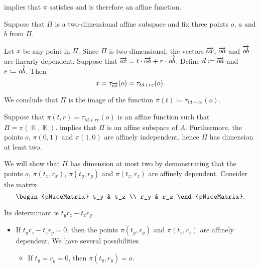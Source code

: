 \begin{defproof}
    implies that \( \pi \) satisfies  and is therefore an affine function.

   Suppose that \( \Pi \) is a two-dimensional affine subspace and fix three points \( o \), \( a \) and \( b \) from \( \Pi \).

  Let \( x \) be any point in \( \Pi \). Since \( \Pi \) is two-dimensional, the vectors \( \overrightarrow{ox} \), \( \overrightarrow{oa} \) and \( \overrightarrow{ob} \) are linearly dependent. Suppose that \( \overrightarrow{ox} = t \cdot \overrightarrow{oa} + r \cdot \overrightarrow{ob} \). Define \( d \coloneqq \overrightarrow{oa} \) and \( e \coloneqq \overrightarrow{ob} \). Then
  \begin{equation*}
    x = \tau_{\overrightarrow{ox}}(o) = \tau_{td + re}(o).
  \end{equation*}

  We conclude that \( \Pi \) is the image of the function \( \pi(t) \coloneqq \tau_{td + re}(o) \).

   Suppose that \( \pi(t, r) = \tau_{td + re}(o) \) is an affine function such that \( \Pi = \pi(\BbbK, \BbbK) \).  implies that \( \Pi \) is an affine subspace of \( A \). Furthermore, the points \( o \), \( \pi(0, 1) \) and \( \pi(1, 0) \) are affinely independent, hence \( \Pi \) has dimension at least two.

  We will show that \( \Pi \) has dimension at most two by demonstrating that the points \( o \), \( \pi(t_x, r_x) \), \( \pi(t_y, r_y) \) and \( \pi(t_z, r_z) \) are affinely dependent. Consider the matrix
  \begin{equation*}
    \begin{pNiceMatrix}
      t_y & t_z \\
      r_y & r_z
    \end{pNiceMatrix}.
  \end{equation*}

  Its determinant is \( t_y r_z - t_z r_y \).

  \begin{itemize}
    \item If \( t_y r_z - t_z r_y = 0 \), then the points \( \pi(t_y, r_y) \) and \( \pi(t_z, r_z) \) are affinely dependent. We have several possibilities
    \begin{itemize}
      \item If \( t_y = r_y = 0 \), then \( \pi(t_y, r_y) = o \).


\end{itemize}
\end{itemize}
\end{defproof}
